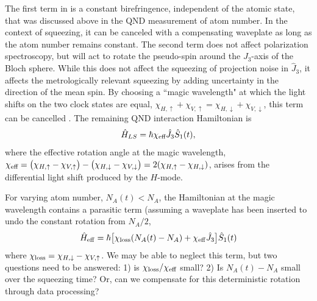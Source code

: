 \documentclass[preprint,aps,pra,onecolumn]{revtex4-1} %
\newcommand{\chieff}{\chi_{\rm eff}}
\newcommand{\change}[1]{{\color{RoyalBlue} #1}}
\newcommand{\comment}[1]{{\color{Maroon} #1}}
\begin{document}
The first term in  is a constant birefringence, independent of the atomic state, that was discussed above in the QND measurement of atom number.  In the context of squeezing, it can be canceled with a compensating waveplate \change{ as long as the atom number remains constant}. The second term does not affect polarization spectroscopy, but will act to rotate the pseudo-spin around the $J_3$-axis of the Bloch sphere.  While this does not affect the squeezing of projection noise in $\hat{J}_3$, it affects the metrologically relevant squeezing by adding uncertainty in the direction of the mean spin.  By choosing a ``magic wavelength" at which the light shifts on the two clock states are equal, $\chi_{H,\uparrow} +\chi_{V,\uparrow}  = \chi_{H,\downarrow} + \chi_{V,\downarrow}$, this term can be cancelled \cite{chaudhury_continuous_2006}. The remaining QND interaction Hamiltonian is
	\begin{equation} \label{Eq::FaradayHam}
		\hat{H}_{LS} = \hbar \chi_{\text{eff}} \hat{J}_3 \hat{S}_1(t),
	\end{equation}
where the effective rotation angle at the magic wavelength,
$\chi_{\text{eff}} = \big( \chi_{H, \uparrow} - \chi_{V,\uparrow} \big) - \big(\chi_{H,\downarrow} - \chi_{V,\downarrow} \big) = 2(\chi_{H, \uparrow}-\chi_{H, \downarrow})$, arises from the differential light shift produced by the $H$-mode.  

\change{For varying atom number, $N_A(t) < N_A$, the Hamiltonian at the magic wavelength contains a parasitic term (assuming a waveplate has been inserted to undo the constant rotation from $N_A/2$,
	\begin{align}
		\hat{H}_{\rm eff} = \hbar \big[ \chi_{\rm loss} (N_A(t)-N_A) + \chieff \hat{J}_3 \big]\hat{S}_1(t)
	\end{align}
where $\chi_{\rm loss} = \chi_{H,\downarrow} - \chi_{V,\uparrow}$.  \comment{We may be able to neglect this term, but two questions need to be answered: 1) is $\chi_{\rm loss}/\chieff$ small?  2) Is $N_A(t) - N_A$ small over the squeezing time? Or, can we compensate for this deterministic rotation through data processing?}
}
\end{document}
